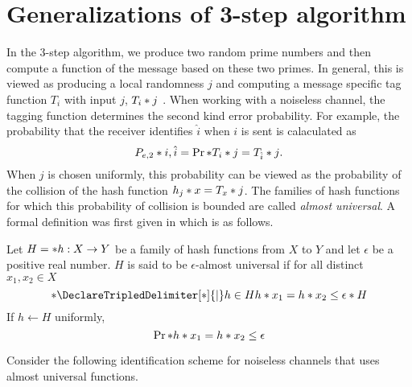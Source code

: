 \section{Generalizations of 3-step algorithm}
In the 3-step algorithm, we produce two random prime numbers and then compute a function of the message based on these two primes. In general, this is viewed as producing a local randomness \(j\) and computing a message specific tag function \(T_i\) with input \(j\), \(\func{T_i}{j}\) \cite{derebeyoglu}. When working with a noiseless channel, the tagging function determines the second kind error probability. For example, the probability that the receiver identifies \(\hat{i}\) when \(i\) is sent is calaculated as 
\begin{equation}
    \func{P_{e,2}}{i,\hat{i}} = \prob{\func{T_i}{j} = \func{T_{\hat{i}}}{j}}.
\end{equation} 
When \(j\) is chosen uniformly, this probability can be viewed as the probability of the collision of the hash function \(\func{h_j}{x} = \func{T_x}{j}\). The families of hash functions for which this probability of collision is bounded are called \textit{almost universal}. A formal definition was first given in \cite{carter} which is as follows.
\begin{definition}
    Let \(H = \set{h : X \to Y}\) be a family of hash functions from \(X\) to \(Y\) and let \(\epsilon\) be a positive real number. \(H\) is said to be \(\epsilon\)-almost universal if for all distinct \(x_1, x_2 \in X\) 
    \begin{equation}
        \abs{\set<h \in H>{\func{h}{x_1} = \func{h}{x_2}}} \leq \epsilon \abs{H}
    \end{equation}
    If \(h \gets H\) uniformly, 
    \begin{equation}
        \prob{\func{h}{x_1} = \func{h}{x_2}} \leq \epsilon
    \end{equation}
\end{definition}

Consider the following identification scheme for noiseless channels that uses almost universal functions.

